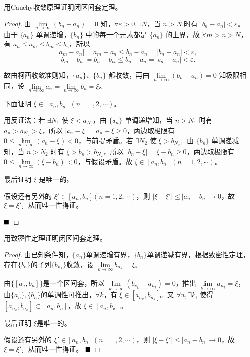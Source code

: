\begin{problem}
    用Cauchy收敛原理证明闭区间套定理。
\end{problem}

\begin{proof}
    由 \(\lim\limits_{n \to \infty} (b_n - a_n) = 0\) 知，\(\forall \varepsilon > 0, \exists N\)，当 \(n > N\) 时有 \(|b_n - a_n| < \varepsilon\)。由于 \(\{a_n\}\) 单调递增，\(\{b_n\}\) 中的每一个元素都是 \(\{a_n\}\) 的上界，故 \(\forall m > n > N\)，有 \(a_n \leq a_m \leq b_m \leq b_n\)，所以
    \[
    |a_m - a_n| = a_m - a_n \leq b_n - a_n = |b_n - a_n| < \varepsilon,
    \]
    \[
    |b_m - b_n| = b_n - b_m \leq b_n - a_n = |b_n - a_n| < \varepsilon.
    \]
    
    故由柯西收敛准则知，\(\{a_n\}\)、\(\{b_n\}\) 都收敛，再由 \(\lim\limits_{n \to \infty} (b_n - a_n) = 0\) 知极限相同，设 \(\lim\limits_{n \to \infty} a_n = \lim\limits_{n \to \infty} b_n = \xi\)。
    
    下面证明 \(\xi \in [a_n, b_n] (n = 1, 2, \cdots)\)。
    
    用反证法：若 \(\exists N_1\) 使 \(\xi < a_{N_1}\)，由 \(\{a_n\}\) 单调递增知，当 \(n > N_1\) 时有 \(a_n > a_{N_1} > \xi\)，所以 \(|a_n - \xi| = a_n - \xi \geq 0\)，两边取极限有 \(0 \leq \lim\limits_{n \to \infty} (a_n - \xi) < 0\)，与前提矛盾。若 \(\exists N_2\) 使 \(\xi > b_{N_2}\)，由 \(\{b_n\}\) 单调递减知，当 \(n > N_2\) 时有 \(\xi > b_n > b_{N_2}\)，所以 \(|b_n - \xi| = \xi - b_n \geq 0\)，两边取极限有 \(0 \leq \lim\limits_{n \to \infty} (\xi - b_n) < 0\)，与假设矛盾。故 \(\xi \in [a_n, b_n] (n = 1, 2, \cdots)\)。
    
    最后证明 \(\xi\) 是唯一的。
    
    假设还有另外的 \(\xi' \in [a_n, b_n] (n = 1, 2, \cdots)\)，则 \(|\xi - \xi'| \leq |a_n - b_n| \to 0\)，故 \(\xi = \xi'\)，从而唯一性得证。
    
    \(\hfill \blacksquare\)
\end{proof}

\begin{problem}
    用致密性定理证明闭区间套定理。
\end{problem}

\begin{proof}
    由已知条件知，$\{a_n\}$单调递增有界，$\{b_n\}$单调递减有界，根据致密性定理，存在$\{b_n\}$的子列$\{b_{n_k}\}$收敛，设 $\lim\limits_{k \to \infty} b_{n_k} = \xi$。
    
    由$\{[a_n, b_n]\}$是一个区间套，所以 $\lim\limits_{k \to \infty} (b_{n_k} - a_{n_k}) = 0$，推出 $\lim\limits_{k \to \infty} a_{n_k} = \xi$，由$\{a_n\}, \{b_n\}$的单调性可推出，$\forall k$，有 $\xi \in [a_{n_k}, b_{n_k}]$。又 $\forall n ,\exists k$, 使得 $[a_{n_k}, b_{n_k}] \subset [a_n, b_n]$，故 $\xi \in [a_n, b_n]$。
    
    最后证明 $\xi$是唯一的。
    
    假设还有另外的 $\xi' \in [a_n, b_n] (n = 1, 2, \cdots)$，则 $|\xi - \xi'| \leq |a_n - b_n| \to 0$，故 $\xi = \xi'$，从而唯一性得证。
    $\hfill \blacksquare$
    \end{proof}


